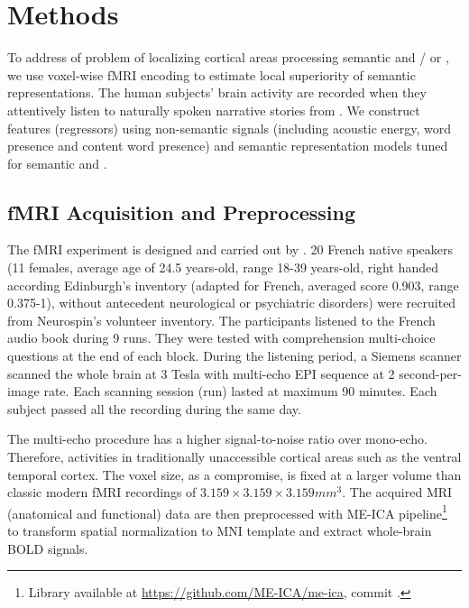 \chapter{Methods} %

\label{chap:methods} %


To address of problem of localizing cortical areas processing semantic \similarity and / or \association, we use voxel-wise fMRI encoding to estimate local superiority of semantic representations. The human subjects' brain activity are recorded when they attentively listen to naturally spoken narrative stories from . We construct features (regressors) using non-semantic signals (including acoustic energy, word presence and content word presence) and semantic representation models tuned for semantic \similarity and \association. 

\section{fMRI Acquisition and Preprocessing}
\label{sec:fmriAcquAndPrepro}

The fMRI experiment is designed and carried out by \textcite{todorovicAnalysesIRMfLors2018}. 20 French native speakers (11 females, average age of 24.5 years-old, range 18-39 years-old, right handed according Edinburgh's inventory \parencite{oldfieldAssessmentAnalysisHandedness1971a} (adapted for French, averaged score 0.903, range 0.375-1), without antecedent neurological or psychiatric disorders) were recruited from Neurospin's volunteer inventory. The participants listened to the French audio book  \parencite{desaint-exuperyLittlePrinceFrench2011} during 9 runs. They were tested with comprehension multi-choice questions at the end of each block. During the listening period, a Siemens scanner scanned the whole brain at 3 Tesla with multi-echo EPI sequence at 2 second-per-image rate. Each scanning session (run) lasted at maximum 90 minutes. Each subject passed all the recording during the same day. 

The multi-echo procedure has a higher signal-to-noise ratio over mono-echo. Therefore, activities in traditionally unaccessible cortical areas such as the ventral temporal cortex. The voxel size, as a compromise, is fixed at a larger volume than classic modern fMRI recordings of  \(3.159 \times 3.159 \times 3.159 mm ^ 3\). The acquired MRI (anatomical and functional) data are then preprocessed with ME-ICA pipeline\footnote{Library available at \url{https://github.com/ME-ICA/me-ica}, commit .} \parencite{kunduDifferentiatingBOLDNonBOLD2012} to transform spatial normalization to MNI template and extract whole-brain BOLD signals. 

